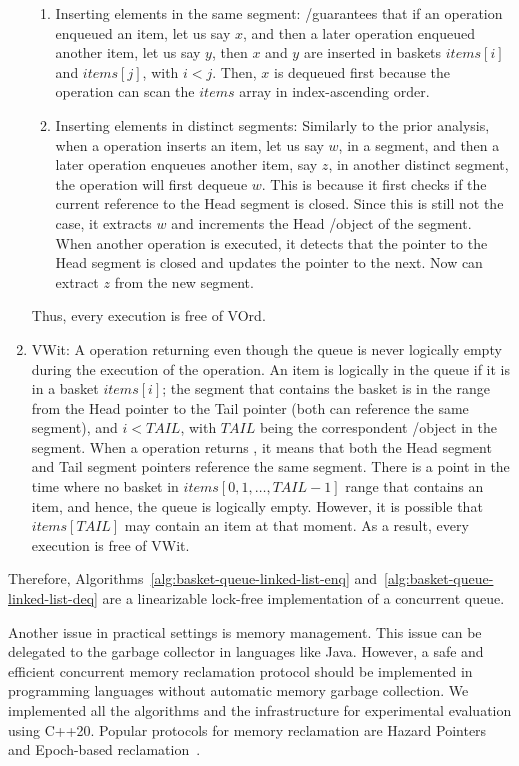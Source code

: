 \begin{proofT}
\begin{enumerate}
    \begin{enumerate}
      \item  Inserting elements in the same segment: \LL/\IC guarantees that if an \Enq operation enqueued an item, let us say \(x\), and then a later \Enq operation enqueued another item, let us say \(y\), then \(x\) and \(y\) are inserted in baskets \(items[i]\) and \(items[j]\), with \(i < j\). Then, \(x\) is dequeued first because the \Deq operation can scan the \(items\) array in index-ascending order. 
      \item Inserting elements in distinct segments: Similarly to the prior analysis, when a \Enq operation inserts an item, let us say \(w\), in a segment, and then a later \Enq operation enqueues another item, say \(z\), in another distinct segment, the \Deq operation will first dequeue \(w\). This is because it first checks if the current reference to the Head segment is closed. Since this is still not the case, it extracts \(w\) and increments the Head \LL/\IC object of the segment. When another \Deq operation is executed, it detects that the pointer to the Head segment is closed and updates the pointer to the next. Now can extract \(z\) from the new segment.   
    \end{enumerate}
    Thus, every execution is free of VOrd.
    \item VWit: A \Deq operation returning \epty even though the queue is never logically empty during the execution of the \Deq operation. An item is logically in the queue if it is in a basket \(items[i]\); the segment that contains the basket is in the range from the Head pointer to the Tail pointer (both can reference the same segment), and \(i < TAIL\), with \(TAIL\) being the correspondent \LL/\IC object in the segment. When a \Deq operation returns \epty, it means that both the Head segment and Tail segment pointers reference the same segment. There is a point in the time where no basket in \(items[0, 1, \ldots, TAIL - 1]\) range that contains an item, and hence, the queue is logically empty. However, it is possible that \(items[TAIL]\) may contain an item at that moment. As a result, every execution is free of VWit.
  \end{enumerate}

  Therefore, Algorithms~\ref{alg:basket-queue-linked-list-enq} and~\ref{alg:basket-queue-linked-list-deq} are a linearizable lock-free implementation of a concurrent queue.
\end{proofT}

Another issue in practical settings is memory management. This issue can be delegated to the garbage collector in languages like Java. However, a safe and efficient concurrent memory reclamation protocol should be implemented in programming languages without automatic memory garbage collection. We implemented all the algorithms and the infrastructure for experimental evaluation using C++20. Popular protocols for memory reclamation are Hazard Pointers~\cite{DBLP_conf_podc_Michael02} and Epoch-based reclamation~\cite{DBLP_phd_ethos_Fraser04,mckenney2001read}.

